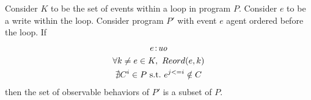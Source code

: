 \begin{corollary}
    \label{LoopInvCodeMotWrite2}
    Consider $K$ to be the set of events within a loop in program $P$. 
    Consider $e$ to be a write within the loop. 
    Consider program $P'$ with event $e$ agent ordered before the loop. 
    If
    \begin{gather*}
        e\!:\!\textit{uo} \label{licmw2:eq1}\\
        \forall k \neq e \in K, \ Reord(e, k) \label{licmw2:eq2}\\ 
        \nexists C^i \in P \ \text{s.t.} \ e^{j<=i} \notin C  \label{licmw2:eq3}                    
    \end{gather*}
    then the set of observable behaviors of $P'$ is a subset of $P$.

\end{corollary}             

